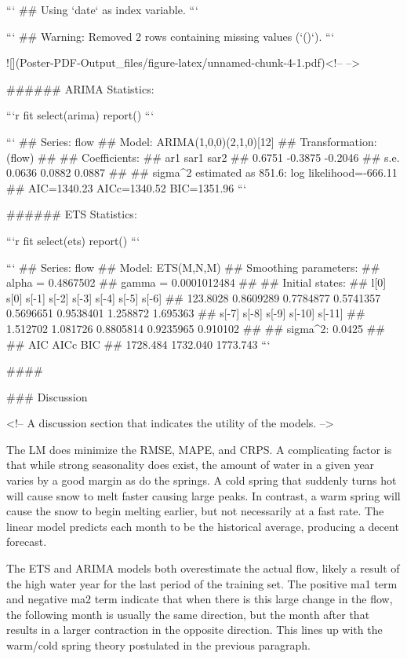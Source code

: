 \documentclass[
]{article}
\begin{document}
\begin{multicols}{4}
```
## Using `date` as index variable.
```

```
## Warning: Removed 2 rows containing missing values (`()`).
```

![](Poster-PDF-Output_files/figure-latex/unnamed-chunk-4-1.pdf)<!-- --> 

###### ARIMA Statistics:





```r
fit %
  select(arima) %
  report()
```

```
## Series: flow 
## Model: ARIMA(1,0,0)(2,1,0)[12] 
## Transformation: (flow) 
## 
## Coefficients:
##          ar1     sar1     sar2
##       0.6751  -0.3875  -0.2046
## s.e.  0.0636   0.0882   0.0887
## 
## sigma^2 estimated as 851.6:  log likelihood=-666.11
## AIC=1340.23   AICc=1340.52   BIC=1351.96
```

###### ETS Statistics:


```r
fit %
  select(ets) %
  report()
```

```
## Series: flow 
## Model: ETS(M,N,M) 
##   Smoothing parameters:
##     alpha = 0.4867502 
##     gamma = 0.0001012484 
## 
##   Initial states:
##      l[0]      s[0]     s[-1]     s[-2]     s[-3]     s[-4]    s[-5]    s[-6]
##  123.8028 0.8609289 0.7784877 0.5741357 0.5696651 0.9538401 1.258872 1.695363
##     s[-7]    s[-8]     s[-9]    s[-10]   s[-11]
##  1.512702 1.081726 0.8805814 0.9235965 0.910102
## 
##   sigma^2:  0.0425
## 
##      AIC     AICc      BIC 
## 1728.484 1732.040 1773.743
```


####

\columnbreak

### Discussion 

<!-- A discussion section that indicates the utility of the models.  -->

The LM does minimize the RMSE, MAPE, and CRPS. A complicating factor is that while strong seasonality does exist, the amount of water in a given year varies by a good margin as do the springs. A cold spring that suddenly turns hot will cause snow to melt faster causing large peaks. In contrast, a warm spring will cause the snow to begin melting earlier, but not necessarily at a fast rate. The linear model predicts each month to be the historical average, producing a decent forecast. 

The ETS and ARIMA models both overestimate the actual flow, likely a result of the high water year for the last period of the training set. The positive ma1 term and negative ma2 term indicate that when there is this large change in the flow, the following month is usually the same direction, but the month after that results in a larger contraction in the opposite direction. This lines up with the warm/cold spring theory postulated in the previous paragraph.


\end{multicols}
\end{document}
